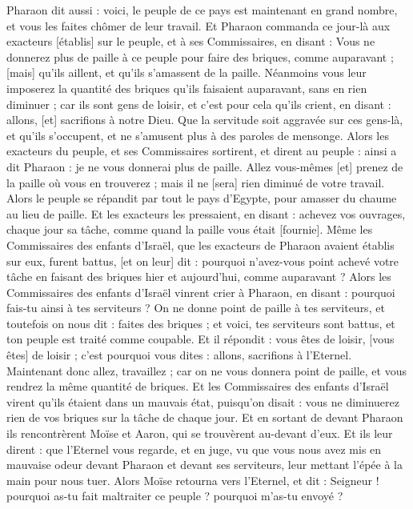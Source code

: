 \begin{multicols}{2}
Pharaon dit aussi : voici, le peuple de ce pays est maintenant en grand nombre, et vous les faites chômer de leur travail.
Et Pharaon commanda ce jour-là aux exacteurs [établis] sur le peuple, et à ses Commissaires, en disant :
Vous ne donnerez plus de paille à ce peuple pour faire des briques, comme auparavant ; [mais] qu'ils aillent, et qu'ils s'amassent de la paille.
Néanmoins vous leur imposerez la quantité des briques qu'ils faisaient auparavant, sans en rien diminuer ; car ils sont gens de loisir, et c'est pour cela qu'ils crient, en disant : allons, [et] sacrifions à notre Dieu.
Que la servitude soit aggravée sur ces gens-là, et qu'ils s'occupent, et ne s'amusent plus à des paroles de mensonge.
Alors les exacteurs du peuple, et ses Commissaires sortirent, et dirent au peuple : ainsi a dit Pharaon : je ne vous donnerai plus de paille.
Allez vous-mêmes [et] prenez de la paille où vous en trouverez ; mais il ne [sera] rien diminué de votre travail.
Alors le peuple se répandit par tout le pays d'Egypte, pour amasser du chaume au lieu de paille.
Et les exacteurs les pressaient, en disant : achevez vos ouvrages, chaque jour sa tâche, comme quand la paille vous était [fournie].
Même les Commissaires des enfants d'Israël, que les exacteurs de Pharaon avaient établis sur eux, furent battus, [et on leur] dit : pourquoi n'avez-vous point achevé votre tâche en faisant des briques hier et aujourd'hui, comme auparavant ?
Alors les Commissaires des enfants d'Israël vinrent crier à Pharaon, en disant : pourquoi fais-tu ainsi à tes serviteurs ?
On ne donne point de paille à tes serviteurs, et toutefois on nous dit : faites des briques ; et voici, tes serviteurs sont battus, et ton peuple est traité comme coupable.
Et il répondit : vous êtes de loisir, [vous êtes] de loisir ; c'est pourquoi vous dites : allons, sacrifions à l'Eternel.
Maintenant donc allez, travaillez ; car on ne vous donnera point de paille, et vous rendrez la même quantité de briques.
Et les Commissaires des enfants d'Israël virent qu'ils étaient dans un mauvais état, puisqu'on disait : vous ne diminuerez rien de vos briques sur la tâche de chaque jour.
Et en sortant de devant Pharaon ils rencontrèrent Moïse et Aaron, qui se trouvèrent au-devant d'eux.
Et ils leur dirent : que l'Eternel vous regarde, et en juge, vu que vous nous avez mis en mauvaise odeur devant Pharaon et devant ses serviteurs, leur mettant l'épée à la main pour nous tuer.
Alors Moïse retourna vers l'Eternel, et dit : Seigneur ! pourquoi as-tu fait maltraiter ce peuple ? pourquoi m'as-tu envoyé ?

\end{multicols}
